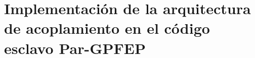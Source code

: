 \chapter{Implementación de la arquitectura de acoplamiento en el código esclavo \textbf{Par-GPFEP}}
\label{C:ap3}
